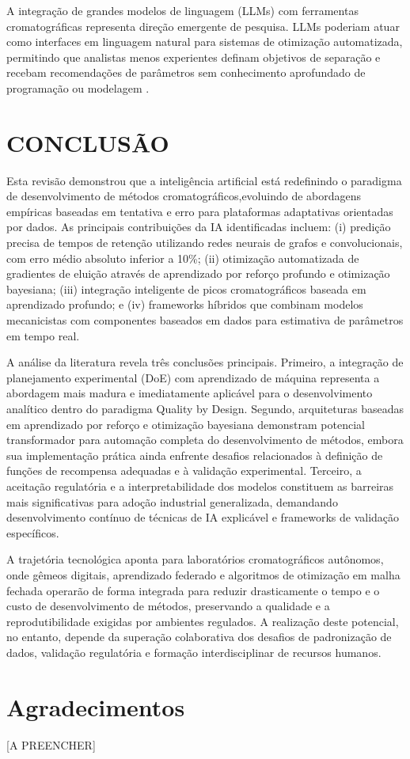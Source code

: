 \documentclass[preprint,12pt]{elsarticle}
\begin{document}
A integração de grandes modelos de linguagem (LLMs) com ferramentas cromatográficas representa direção emergente de pesquisa. LLMs poderiam atuar como interfaces em linguagem natural para sistemas de otimização automatizada, permitindo que analistas menos experientes definam objetivos de separação e recebam recomendações de parâmetros sem conhecimento aprofundado de programação ou modelagem \cite{antony2025}.

\section{CONCLUSÃO}

Esta revisão demonstrou que a inteligência artificial está redefinindo o paradigma de desenvolvimento de métodos cromatográficos,evoluindo de abordagens empíricas baseadas em tentativa e erro para plataformas adaptativas orientadas por dados. As principais contribuições da IA identificadas incluem: (i) predição precisa de tempos de retenção utilizando redes neurais de grafos e convolucionais, com erro médio absoluto inferior a 10\%; (ii) otimização automatizada de gradientes de eluição através de aprendizado por reforço profundo e otimização bayesiana; (iii) integração inteligente de picos cromatográficos baseada em aprendizado profundo; e (iv) frameworks híbridos que combinam modelos mecanicistas com componentes baseados em dados para estimativa de parâmetros em tempo real.

A análise da literatura revela três conclusões principais. Primeiro, a integração de planejamento experimental (DoE) com aprendizado de máquina representa a abordagem mais madura e imediatamente aplicável para o desenvolvimento analítico dentro do paradigma Quality by Design. Segundo, arquiteturas baseadas em aprendizado por reforço e otimização bayesiana demonstram potencial transformador para automação completa do desenvolvimento de métodos, embora sua implementação prática ainda enfrente desafios relacionados à definição de funções de recompensa adequadas e à validação experimental. Terceiro, a aceitação regulatória e a interpretabilidade dos modelos constituem as barreiras mais significativas para adoção industrial generalizada, demandando desenvolvimento contínuo de técnicas de IA explicável e frameworks de validação específicos.

A trajetória tecnológica aponta para laboratórios cromatográficos autônomos, onde gêmeos digitais, aprendizado federado e algoritmos de otimização em malha fechada operarão de forma integrada para reduzir drasticamente o tempo e o custo de desenvolvimento de métodos, preservando a qualidade e a reprodutibilidade exigidas por ambientes regulados. A realização deste potencial, no entanto, depende da superação colaborativa dos desafios de padronização de dados, validação regulatória e formação interdisciplinar de recursos humanos.

\section*{Agradecimentos}

[A PREENCHER]



\end{document}

